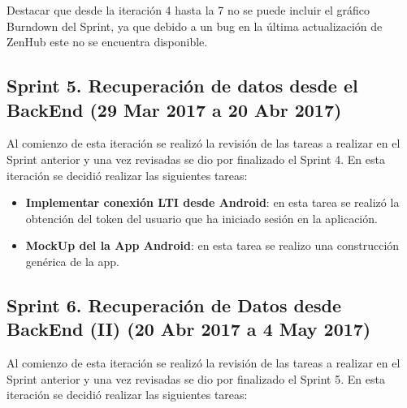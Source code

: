 Destacar que desde la iteración 4 hasta la 7 no se puede incluir el gráfico Burndown del Sprint, ya que debido a un bug en la última actualización de ZenHub este no se encuentra disponible.

\subsection{Sprint 5. Recuperación de datos desde el BackEnd (29 Mar 2017 a 20 Abr 2017)}

Al comienzo de esta iteración se realizó la revisión de las tareas a realizar en el Sprint anterior y una vez revisadas se dio por finalizado el Sprint 4. 
En esta iteración se decidió realizar las siguientes tareas:

\begin{itemize}

	\item \textbf{Implementar conexión LTI desde Android}: en esta tarea se realizó la obtención del token del usuario que ha iniciado sesión en la aplicación.
	\item \textbf{MockUp del la App Android}: en esta tarea se realizo una construcción genérica de la app.


\end{itemize}


\subsection{Sprint 6. Recuperación de Datos desde BackEnd (II) (20 Abr 2017 a 4 May 2017)}

Al comienzo de esta iteración se realizó la revisión de las tareas a realizar en el Sprint anterior y una vez revisadas se dio por finalizado el Sprint 5. 
En esta iteración se decidió realizar las siguientes tareas:

